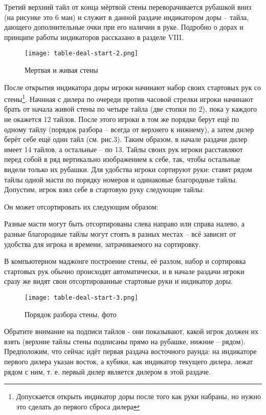 Третий верхний тайл от конца мёртвой стены переворачивается рубашкой вниз (на рисунке это 6 ман) и служит в данной раздаче индикатором доры – тайла, дающего дополнительные очки при его наличии в руке. Подробно о дорах и принципе работы индикаторов рассказано в разделе VIII.

\begin{figure}[H]
	\centering
	\texttt{[image: table-deal-start-2.png]}
	\caption{Мертвая и живая стены}
\end{figure}

После открытия индикатора доры игроки начинают набор своих стартовых рук со стены\footnote{Допускается открыть индикатор доры после того как руки набраны, но нужно это сделать до первого сброса дилера}. Начиная с дилера по очереди против часовой стрелки игроки начинают брать от начала живой стены по четыре тайла (две стопки по 2), пока у каждого не окажется 12 тайлов. После этого игроки в том же порядке берут ещё по одному тайлу (порядок разбора – всегда от верхнего к нижнему), а затем дилер берёт себе ещё один тайл (см. рис.3). Таким образом, в начале раздачи дилер имеет 14 тайлов, а остальные – по 13. Тайлы своих рук игроки расставляют перед собой в ряд вертикально изображением к себе, так, чтобы остальные видели только их рубашки. Для удобства игроки сортируют руки: ставят рядом тайлы одной масти по порядку номеров и одинаковые благородные тайлы. Допустим, игрок взял себе в стартовую руку следующие тайлы:


Он может отсортировать их следующим образом:


Разные масти могут быть отсортированы слева направо или справа налево, а разные благородные тайлы могут стоять в разных местах – всё зависит от удобства для игрока и времени, затрачиваемого на сортировку.

В компьютерном маджонге построение стены, её разлом, набор и сортировка стартовых рук обычно происходят автоматически, и в начале раздачи игроки сразу же видят свои отсортированные стартовые руки и индикатор доры. 

\begin{figure}[H]
	\centering
	\texttt{[image: table-deal-start-3.png]}
	\caption{Порядок разбора стены, фото}
\end{figure}

Обратите внимание на подписи тайлов - они показывают, какой игрок должен их взять (верхние тайлы стены подписаны прямо на рубашке, нижние – рядом). Предположим, что сейчас идёт первая раздача восточного раунда: на индикаторе первого дилера указан восток, а кубики, как индикатор текущего дилера, лежат рядом с ним, т. е. первый дилер является дилером в этой раздаче.

